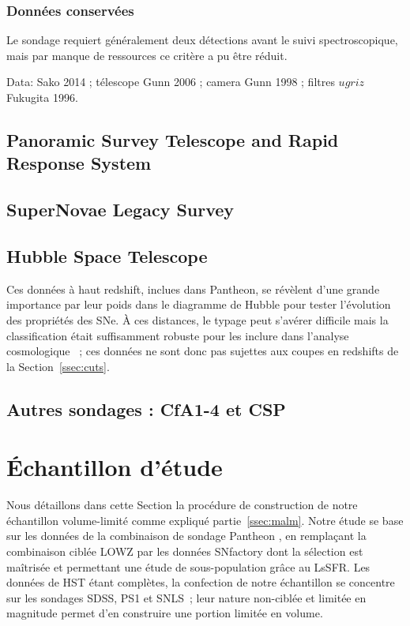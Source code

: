\documentclass[../main/main.tex]{subfiles}
\begin{document}
\subsubsection{Données conservées}\label{sssec:sdssdata}

Le sondage requiert généralement deux détections avant le suivi spectroscopique,
mais par manque de ressources ce critère a pu être réduit. 

Data: Sako 2014 ; télescope Gunn 2006 ; camera Gunn 1998 ; filtres $ugriz$
Fukugita 1996.

\subsection{Panoramic Survey Telescope and Rapid Response
System}\label{ssec:ps1}

\subsection{SuperNovae Legacy Survey}\label{ssec:snls}



\subsection{Hubble Space Telescope}\label{ssec:hst}

Ces données à haut redshift, inclues dans Pantheon, se révèlent d'une grande
importance par leur poids dans le diagramme de Hubble pour tester l'évolution
des propriétés des SNe. À ces distances, le typage peut s'avérer difficile mais
la classification était suffisamment robuste pour les inclure dans l'analyse
cosmologique \citep{scolnic2018}~; ces données ne sont donc pas sujettes aux
coupes en redshifts de la Section~\ref{ssec:cuts}.

\subsection{Autres sondages : CfA1-4 et CSP}\label{ssec:lowz}


\section{Échantillon d'étude}\label{sec:sample}

Nous détaillons dans cette Section la procédure de construction de notre
échantillon volume-limité comme expliqué partie~\ref{ssec:malm}. Notre étude se
base sur les données de la combinaison de sondage Pantheon \citep{scolnic2018},
en remplaçant la combinaison ciblée LOWZ par les données SNfactory dont la
sélection est maîtrisée et permettant une étude de sous-population grâce au
LsSFR. Les données de HST étant complètes, la confection de notre échantillon se
concentre sur les sondages SDSS, PS1 et SNLS~; leur nature non-ciblée et limitée
en magnitude permet d'en construire une portion limitée en volume.
\end{document}
